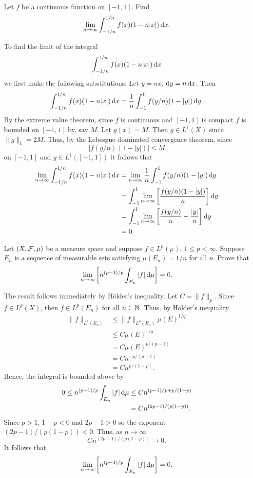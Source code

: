 \begin{problem}
  Let $f$ be a continuous function on $[-1,1]$. Find
  \[
    \lim_{n\to\infty}\int_{-1/n}^{1/n} f(x)(1-n|x|)\mathop{}\!\mathrm{d} x.
  \]
\end{problem}
\begin{solution}
  To find the limit of the integral
  \[
    \int_{-1/n}^{1/n} f(x)(1-n|x|)\mathop{}\!\mathrm{d} x
  \]
  we first make the following substitutions: Let $y=nx$, $\mathrm{d} y=n\mathop{}\!\mathrm{d}
  x$. Then
  \[
    \int_{-1/n}^{1/n} f(x)(1-n|x|)\diff x%
    =\frac{1}{n}\int_{-1}^1 f(y/n)(1-|y|)\diff y.
  \]
  By the extreme value theorem, since $f$ is continuous and $[-1,1]$ is
  compact $f$ is bounded on $[-1,1]$ by, say $M$. Let $g(x)=M$. Then $g\in
  L^1(X)$ since $\|g\|_1=2M$. Thus, by the Lebesgue dominated convergence
  theorem, since
  \[
    \left|f(y/n)(1-|y|)\right|\leq M
  \]
  on $[-1,1]$ and $g\in L^1([-1,1])$ it follows that
  \begin{align*}
    \lim_{n\to\infty}\int_{-1/n}^{1/n} f(x)(1-n|x|)\diff x
    &=\lim_{n\to\infty}\frac{1}{n}\int_{-1}^1 f(y/n)(1-|y|)\diff y\\
    &=\int_{-1}^1\lim_{n\to\infty}\left[\frac{f(y/n)(1-|y|)}{n}\right]\rmd
      y\\
    &=\int_{-1}^1\lim_{n\to\infty}%
      \left[%
      \frac{f(y/n)}{n}-\frac{|y|}{n}
      \right]\rmd y\\%
    &=0.
  \end{align*}
\end{solution}

\begin{problem}
  Let $(X,\mathcal{F},\mu)$ be a measure space and suppose $f\in L^p(\mu)$,
  $1\leq p<\infty$. Suppose $E_n$ is a sequence of measurable sets
  satisfying $\mu(E_n)=1/n$ for all $n$. Prove that
  \[
    \lim_{n\to\infty}\left[n^{(p-1)/p}\int_{E_n}|f|\mathop{}\!\mathrm{d}\mu\right]=0.
  \]
\end{problem}
\begin{solution}
  The result follows immediately by Hölder's inequality. Let
  $C=\|f\|_p$. Since $f\in L^p(X)$, then $f\in L^p(E_n)$ for all
  $n\in\mathbb{N}$. Thus, by Hölder's inequality
  \[
    \begin{aligned}
      \|f\|_{L^1(E_n)}&\leq \|f\|_{L^p(E_n)}\mu(E)^{1/q}\\
      &\leq C\mu(E)^{1/q}\\
      &=C\mu(E)^{p/(p-1)}\\
      &=Cn^{-p/(p-1)}\\
      &=Cn^{p/(1-p)}.
    \end{aligned}
  \]
  Hence, the integral is bounded above by
  \begin{align*}
    0\leq
    n^{(p-1)/p}\int_{E_n}|f|\mathop{}\!\mathrm{d}\mu
    &\leq Cn^{(p-1)/p+p/(1-p)}\\
    &=Cn^{(2p-1)/(p(1-p))}.
  \end{align*}
  Since $p>1$, $1-p<0$ and $2p-1>0$ so the exponent
  $(2p-1)/(p(1-p))<0$. Thus, as $n\to\infty$
  \[
    Cn^{(2p-1)/(p(1-p))}\longrightarrow 0.
  \]
  It follows that
  \[
    \lim_{n\to\infty}\left[n^{(p-1)/p}\int_{E_n}|f|\mathop{}\!\mathrm{d}\mu\right]=0.
  \]
\end{solution}

